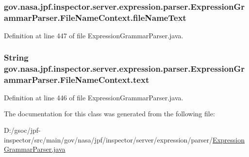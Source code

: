 \subsubsection[{\texorpdfstring{file\+Name\+Text}{fileNameText}}]{ gov.\+nasa.\+jpf.\+inspector.\+server.\+expression.\+parser.\+Expression\+Grammar\+Parser.\+File\+Name\+Context.\+file\+Name\+Text}\hypertarget{classgov_1_1nasa_1_1jpf_1_1inspector_1_1server_1_1expression_1_1parser_1_1_expression_grammar_parser_1_1_file_name_context_a5b3d6eccdb77318d1c2083eb9f580324}{}\label{classgov_1_1nasa_1_1jpf_1_1inspector_1_1server_1_1expression_1_1parser_1_1_expression_grammar_parser_1_1_file_name_context_a5b3d6eccdb77318d1c2083eb9f580324}


Definition at line 447 of file Expression\+Grammar\+Parser.\+java.

\subsubsection[{\texorpdfstring{text}{text}}]{\setlength{\rightskip}{0pt plus 5cm}String gov.\+nasa.\+jpf.\+inspector.\+server.\+expression.\+parser.\+Expression\+Grammar\+Parser.\+File\+Name\+Context.\+text}\hypertarget{classgov_1_1nasa_1_1jpf_1_1inspector_1_1server_1_1expression_1_1parser_1_1_expression_grammar_parser_1_1_file_name_context_a23513651c36192a6f3abb74290d9ada4}{}\label{classgov_1_1nasa_1_1jpf_1_1inspector_1_1server_1_1expression_1_1parser_1_1_expression_grammar_parser_1_1_file_name_context_a23513651c36192a6f3abb74290d9ada4}


Definition at line 446 of file Expression\+Grammar\+Parser.\+java.



The documentation for this class was generated from the following file\+:\begin{DoxyCompactItemize}
\item 
D\+:/gsoc/jpf-\/inspector/src/main/gov/nasa/jpf/inspector/server/expression/parser/\hyperlink{_expression_grammar_parser_8java}{Expression\+Grammar\+Parser.\+java}\end{DoxyCompactItemize}
